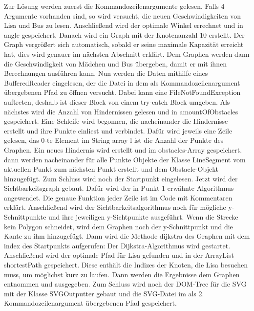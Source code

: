 \documentclass[a4paper,10pt,ngerman]{scrartcl}
\begin{document}
Zur Lösung werden zuerst die Kommandozeilenargumente gelesen. Falls 4 Argumente vorhanden sind, so wird versucht, die neuen Geschwindigkeiten von Lisa und Bus zu lesen. Anschließend wird der optimale Winkel errechnet und in angle gespeichert. Danach wird ein Graph mit der Knotenanzahl 10 erstellt. Der Graph vergrößert sich automatisch, sobald er seine maximale Kapazität erreicht hat, dies wird genauer im nächsten Abschnitt erklärt. Dem Graphen werden dann die Geschwindigkeit von Mädchen und Bus übergeben, damit er mit ihnen Berechnungen ausführen kann. Nun werden die Daten mithilfe eines BufferedReader eingelesen, der die Datei in dem als Kommandozeilenargument übergebenen Pfad zu öffnen versucht. Dabei kann eine FileNotFoundException auftreten, deshalb ist dieser Block von einem try-catch Block umgeben. Als nächstes wird die Anzahl von Hindernissen gelesen und in amountOfObstacles gespeichert. Eine Schleife wird begonnen, die nacheinander die Hindernisse erstellt und ihre Punkte einliest und verbindet. Dafür wird jeweils eine Zeile gelesen, das 0-te Element im String array l ist die Anzahl der Punkte des Graphen. Ein neues Hindernis wird erstellt und im obstacles-Array gespeichert. dann werden nacheinander für alle Punkte Objekte der Klasse LineSegment vom aktuellen Punkt zum nächsten Punkt erstellt und dem Obstacle-Objekt hinzugefügt. Zum Schluss wird noch der Startpunkt eingelesen.
Jetzt wird der Sichtbarkeitsgraph gebaut. Dafür wird der in Punkt 1 erwähnte Algorithmus angewendet. Die genaue Funktion jeder Zeile ist im Code mit Kommentaren erklärt. Anschließend wird der Sichtbarkeitsalgorithmus noch für mögliche y-Schnittpunkte und ihre jeweiligen y-Sichtpunkte ausgeführt. Wenn die Strecke kein Polygon schneidet, wird dem Graphen noch der y-Schnittpunkt und die Kante zu ihm hinzugefügt.
Dann wird die Methode dijkstra des Graphen mit dem index des Startpunkts aufgerufen: Der Dijkstra-Algorithmus wird gestartet.
Anschließend wird der optimale Pfad für Lisa gefunden und in der ArrayList shortestPath gespeichert. Diese enthält die Indizes der Knoten, die Lisa besuchen muss, um möglichst kurz zu laufen. Dann werden die Ergebnisse dem Graphen entnommen und ausgegeben.
Zum Schluss wird noch der DOM-Tree für die SVG mit der Klasse SVGOutputter gebaut und die SVG-Datei im als 2. Kommandozeilenargument übergebenen Pfad gespeichert.
\end{document}

